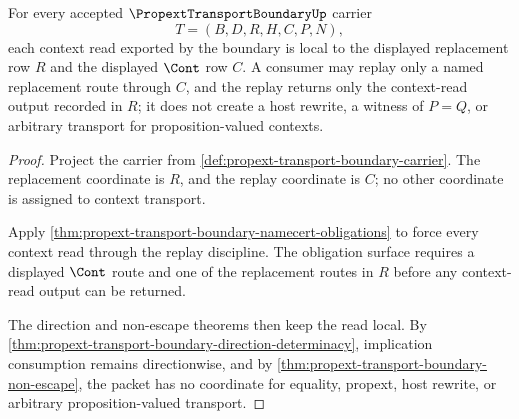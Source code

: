\begin{theorem}
\label{thm:propext-transport-boundary-context-replacement-locality}
For every accepted $\PropextTransportBoundaryUp$ carrier
$$
T=(B,D,R,H,C,P,N),
$$
each context read exported by the boundary is local to the displayed replacement row $R$ and the displayed $\Cont$ row $C$. A consumer may replay only a named replacement route through $C$, and the replay returns only the context-read output recorded in $R$; it does not create a host rewrite, a witness of $P=Q$, or arbitrary transport for proposition-valued contexts.
\end{theorem}
\begin{proof}
Project the carrier from \autoref{def:propext-transport-boundary-carrier}. The replacement coordinate is $R$, and the replay coordinate is $C$; no other coordinate is assigned to context transport.

Apply \autoref{thm:propext-transport-boundary-namecert-obligations} to force every context read through the replay discipline. The obligation surface requires a displayed $\Cont$ route and one of the replacement routes in $R$ before any context-read output can be returned.

The direction and non-escape theorems then keep the read local. By \autoref{thm:propext-transport-boundary-direction-determinacy}, implication consumption remains directionwise, and by \autoref{thm:propext-transport-boundary-non-escape}, the packet has no coordinate for equality, propext, host rewrite, or arbitrary proposition-valued transport.
\end{proof}


